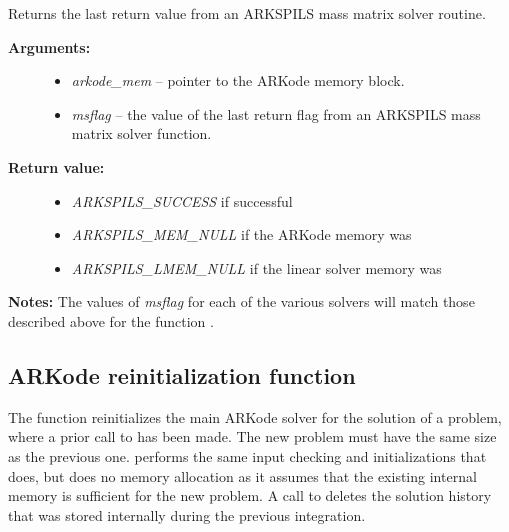 \documentclass[letterpaper,10pt,english]{sphinxmanual}
\begin{document}
\begin{fulllineitems}
\label{c_interface/User_callable:c.ARKSpilsGetLastMassFlag}
Returns the last return value from an ARKSPILS mass matrix solver routine.
\begin{description}
\item[{\textbf{Arguments:}}] \leavevmode\begin{itemize}
\item {} 
\emph{arkode\_mem} -- pointer to the ARKode memory block.

\item {} 
\emph{msflag} -- the value of the last return flag from an
ARKSPILS mass matrix solver function.

\end{itemize}

\item[{\textbf{Return value:}}] \leavevmode\begin{itemize}
\item {} 
\emph{ARKSPILS\_SUCCESS} if successful

\item {} 
\emph{ARKSPILS\_MEM\_NULL} if the ARKode memory was 

\item {} 
\emph{ARKSPILS\_LMEM\_NULL} if the linear solver memory was 

\end{itemize}

\end{description}

\textbf{Notes:} The values of \emph{msflag} for each of the various solvers
will match those described above for the function
{\hyperref[c_interface/User_callable:c.ARKSpilsGetLastFlag]{\emph{}}}.

\end{fulllineitems}



\subsection{ARKode reinitialization function}
\label{c_interface/User_callable:cinterface-reinitialization}\label{c_interface/User_callable:arkode-reinitialization-function}
The function {\hyperref[c_interface/User_callable:c.ARKodeReInit]{\emph{}}} reinitializes the main ARKode
solver for the solution of a problem, where a prior call to
{\hyperref[c_interface/User_callable:c.ARKodeInit]{\emph{}}} has been made. The new problem must have the
same size as the previous one.  {\hyperref[c_interface/User_callable:c.ARKodeReInit]{\emph{}}} performs the
same input checking and initializations that {\hyperref[c_interface/User_callable:c.ARKodeInit]{\emph{}}}
does, but does no memory allocation as it assumes that the existing
internal memory is sufficient for the new problem.  A call to
{\hyperref[c_interface/User_callable:c.ARKodeReInit]{\emph{}}} deletes the solution history that was stored
internally during the previous integration.
\end{document}
